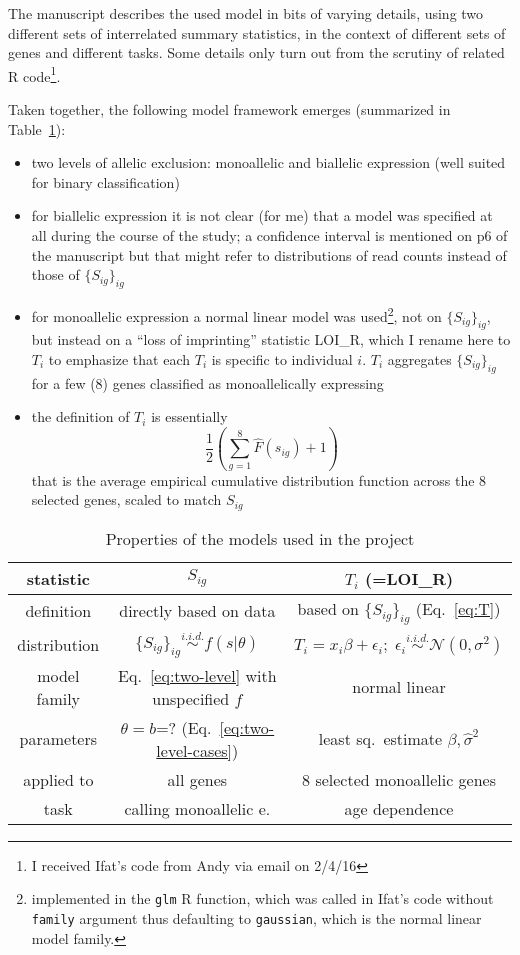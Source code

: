 \documentclass[letterpaper]{article}
\begin{document}
The manuscript describes the used model in bits of varying details, using two
different sets of interrelated summary statistics, in the context of different
sets of genes and different tasks.  Some details only turn out from the
scrutiny of related R code\footnote{I received Ifat's code from Andy via email
on 2/4/16}.

Taken together, the following model framework emerges (summarized in
Table~\ref{tab:model-used}):
\begin{itemize}
\item two levels of allelic exclusion: monoallelic and biallelic expression (well suited for binary classification)
\item for biallelic expression it is not clear (for me) that a model was
specified at all during the course of the study;
a confidence interval is mentioned on p6 of the manuscript but that might refer to distributions
of read counts instead of those of \(\{S_{ig}\}_{ig}\)
\item for monoallelic expression a normal linear model was used\footnote{implemented in the
\texttt{glm} R function, which was called in Ifat's code without
\texttt{family} argument thus defaulting to \texttt{gaussian}, which is the
normal linear model family. }, not on \(\{S_{ig}\}_{ig}\), but instead on a ``loss of imprinting'' statistic LOI\_R,
which I rename here to \(T_i\) to emphasize that each \(T_i\) is specific to 
individual \(i\).  \(T_i\) aggregates \(\{S_{ig}\}_{ig}\) for a few (8) genes classified
as monoallelically expressing
\item the definition of \(T_i\) is essentially
\begin{equation}
\label{eq:T}
\frac{1}{2}\left(\sum_{g=1}^8 \hat{F}(s_{ig}) + 1 \right)
\end{equation}
that is the average empirical cumulative distribution function across the 8
selected genes,
scaled to match \(S_{ig}\)
\end{itemize}

\begin{table}[t]
\label{tab:model-used}
\begin{tabular}{c|c|c|}
statistic & \(S_{ig}\) & \(T_i\) (=LOI\_R) \\
\hline
definition & directly based on data & based on \(\{S_{ig}\}_{ig}\) (Eq.~\ref{eq:T}) \\
distribution & \(\{S_{ig}\}_{ig} \overset{i.i.d.}{\sim} f(s |
\theta) \) &
\(T_{i} = x_i \beta + \epsilon_i; \; \epsilon_i \overset{i.i.d.}{\sim}
\mathcal{N}(0, \sigma^2)\) \\
model family & Eq.~\ref{eq:two-level} with unspecified \(f\) & normal linear \\
parameters & \(\theta=b\)=? (Eq.~\ref{eq:two-level-cases})& least sq.~estimate \(\hat{\beta}, \hat{\sigma}^2\) \\
applied to & all genes & 8 selected monoallelic genes \\
task & calling monoallelic e. & age dependence \\
\hline
\end{tabular}
\caption{Properties of the models used in the project}
\end{table}
\end{document}
